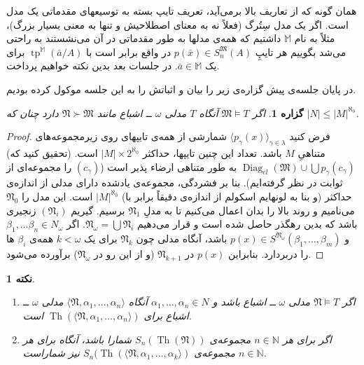 \documentclass[12pt,a4paper]{article}
\theoremstyle{colorhead}
\newtheorem{prop}[thm]{گزاره}
\newtheorem{nokte}[thm]{نکته}
\DeclareMathOperator{\Th}{Th}
\DeclareMathOperator{\diag}{Diag}
\DeclareMathOperator{\tp}{tp}
\begin{document}
همان گونه که از تعاریف بالا برمی‌آید، 
تعریف تایپ
بسته به توسیعهای مقدماتی یک مدل است. 
اگر یک مدل سِتُرگ (فعلاً 
نه به معنای اصطلاحیش و تنها به معنی
بسیار بزرگ)، مثلاً به نام
$\mathbb{M}$
داشتیم که همه‌ی مدلها به طور مقدماتی در آن می‌نشستند به راحتی
می‌شد بگوییم 
هر تایپِ
$p(\bar{x})\in S^\mathfrak{M}_n(A)$
در واقع برابر است با
$\tp^\mathbb{M}(\bar{a}/A)$
برای یک
$\bar{a}\in \mathbb{M}$.
در جلسات بعد بدین نکته خواهیم پرداخت. 
\par 
در پایان جلسه‌ی پیش گزاره‌ی زیر را بیان و اثباتش را به این جلسه موکول کرده‌ بودیم.
\begin{prop}
\label{eshba'sizekuchak}
اگر
$\mathfrak{M}\models T$
آنگاه 
$T$
مدلی
$\omega$
ــ
اشباع مانند
$\mathfrak{N}\succ \mathfrak{M}$
دارد چنان که
$|N|\leq |M|^{\aleph_0}$.
\end{prop}
\begin{proof}
فرض کنید
$\langle p_\gamma(x)\rangle_{\gamma\in \lambda}$
شمارشی از همه‌ی تایپهای روی زیرمجموعه‌های متناهیِ
$M$
باشد. تعداد این چنین تایپها، حداکثر
$|M|\times 2^{\aleph_0}$
است. (تحقیق کنید که)
$\diag_{el}(\mathfrak{M})\cup \bigcup p_\gamma(c_\gamma)$
به طور متناهی ارضاء پذیر است ($(c_\gamma)$ را مجموعه‌ای از ثوابت در نظر گرفته‌ایم).
بنا بر فشردگی، مجموعه‌ی یادشده دارای مدلی از اندازه‌ی حداکثر (و بنا به لونهایم اسکولم از اندازه‌ی دقیقاً برابر با)
$|M|^{\aleph_0}$
است. این مدل را
$\mathfrak{N}_0$
می‌نامیم و روند بالا را بدان اعمال می‌کنیم تا به مدلِ
$\mathfrak{N}_1$
برسیم. گیریم
$(\mathfrak{N}_i)$
زنجیری باشد که بدین رهگذر حاصل شده است و قرار می‌دهیم
$\mathfrak{N}_\omega=\bigcup \mathfrak{N}_i$.
اگر
$\beta_1,\ldots\beta_n\in N_\omega$
و
$p(x)\in S^{\mathfrak{N}_\omega}(\beta_1,\ldots,\beta_m)$
باشد، آنگاه مدلی چون
$\mathfrak{N}_k$
برای یک
$k<\omega$
همه‌ی
$\beta_i$
ها را دربردارد. بنابراین
$p(x)$
در
$\mathfrak{N}_{k+1}$
(و از این رو در
$\mathfrak{N}_\omega$)
برآورده می‌شود. 
\end{proof}
\begin{nokte}
\hfill
\begin{enumerate}
\item
اگر
$\mathfrak{N}\models T$
مدلی
$\omega$
ــ
اشباع باشد و 
$\alpha_1,\ldots,\alpha_n\in N$
آنگاه
$\langle \mathfrak{N},\alpha_1,\ldots,\alpha_n\rangle$
مدلی 
$\omega$
ــ 
اشباع برای
$\Th(\langle \mathfrak{N},\alpha_1,\ldots,\alpha_n\rangle)$
است. 
\item 
اگر برای هر
$n\in \mathbb{N}$
مجموعه‌ی
$S_n(\Th(\mathfrak{N}))$
شمارا باشد،‌
آنگاه 
برای هر
$n\in \mathbb{N}$
مجموعه‌ی
$S_n(\Th(\langle \mathfrak{N},\alpha_1,\ldots,\alpha_k\rangle)$
نیز شماراست.
\end{enumerate}
\end{nokte}
\end{document}
